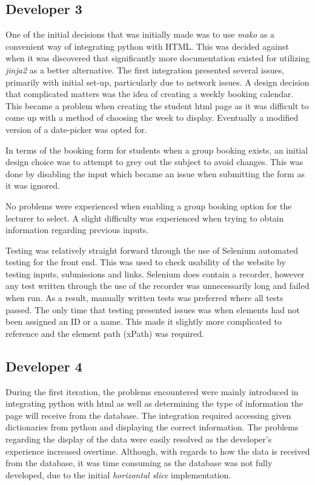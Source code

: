 \documentclass[11pt, a4paper]{article}
\begin{document}
	\subsection{Developer 3}
	One of the initial decisions that was initially made was to use \textit{mako} as a convenient way of integrating python with HTML. This was decided against when it was discovered that significantly more documentation existed for utilizing \textit{jinja2} as a better alternative. The first integration presented several issues, primarily with initial set-up, particularly due to network issues. A design decision that complicated matters was the idea of creating a weekly booking calendar. This became a problem when creating the student html page as it was difficult to come up with a method of choosing the week to display. Eventually a modified version of a date-picker was opted for.
	
	In terms of the booking form for students when a group booking exists, an initial design choice was to attempt to grey out the subject to avoid changes. This was done by disabling the input which became an issue when submitting the form as it was ignored.
	
	No problems were experienced when enabling a group booking option for the lecturer to select. A slight difficulty was experienced when trying to obtain information regarding previous inputs.
	
	Testing was relatively straight forward through the use of Selenium automated testing for the front end. This was used to check usability of the website by testing inputs, submissions and links. Selenium does contain a recorder, however any test written through the use of the recorder was unnecessarily long and failed when run. As a result, manually written tests was preferred where all tests passed. The only time that testing presented issues was when elements had not been assigned an ID or a name. This made it slightly more complicated to reference and the element path (xPath) was required.
	
	\subsection{Developer 4}
	During the first iteration, the problems encountered were mainly introduced in integrating python with html as well as determining the type of information the page will receive from the database. The integration required accessing given dictionaries from python and displaying the correct information. The problems regarding the display of the data were easily resolved as the developer's experience increased overtime. Although, with regards to how the data is received from the database, it was time consuming as the database was not fully developed, due to the initial \textit{horizontal slice} implementation.
	
\end{document}
